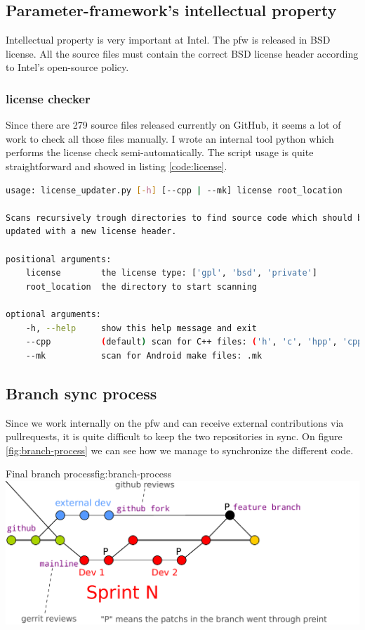 \subsection{Parameter-framework's intellectual property}
Intellectual property is very important at Intel. The \gls{pfw} is released in
BSD license. All the source files must contain the correct BSD license header according
to Intel's open-source policy.

\subsubsection{license checker}
Since there are 279 source files released currently on \gls{GitHub}, it seems a lot of
work to check all those files manually.
I wrote an internal tool \gls{python} which performs the license check semi-automatically.
The script usage is quite straightforward and showed in listing \ref{code:license}.

\begin{lstlisting}[language=bash, caption=License checker usage, label=code:license]
usage: license_updater.py [-h] [--cpp | --mk] license root_location

Scans recursively trough directories to find source code which should be
updated with a new license header.

positional arguments:
    license        the license type: ['gpl', 'bsd', 'private']
    root_location  the directory to start scanning

optional arguments:
    -h, --help     show this help message and exit
    --cpp          (default) scan for C++ files: ('h', 'c', 'hpp', 'cpp')
    --mk           scan for Android make files: .mk
\end{lstlisting}


\subsection{Branch sync process}
Since we work internally on the \gls{pfw} and can receive external contributions via \gls{pullrequests},
it is quite difficult to keep the two repositories in sync.
On figure \ref{fig:branch-process} we can see how we manage to synchronize the different code.

\begin{figureGraphics}{Final branch process}{fig:branch-process}
    \includegraphics[width=\textwidth]{./src/img/branches-process.pdf}
\end{figureGraphics}


